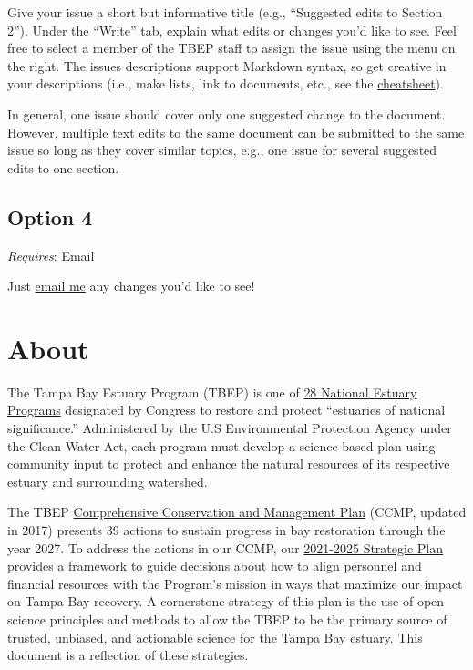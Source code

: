 \documentclass[
]{book}
\begin{document}
Give your issue a short but informative title (e.g., ``Suggested edits to Section 2''). Under the ``Write'' tab, explain what edits or changes you'd like to see. Feel free to select a member of the TBEP staff to assign the issue using the menu on the right. The issues descriptions support Markdown syntax, so get creative in your descriptions (i.e., make lists, link to documents, etc., see the \href{https://rstudio.com/wp-content/uploads/2015/03/rmarkdown-reference.pdf}{cheatsheet}).

In general, one issue should cover only one suggested change to the document. However, multiple text edits to the same document can be submitted to the same issue so long as they cover similar topics, e.g., one issue for several suggested edits to one section.

\hypertarget{opt4}{%
\subsection{Option 4}\label{opt4}}

\emph{Requires}: Email

Just \href{mailto:mbeck@tbep.org}{email me} any changes you'd like to see!

\hypertarget{about}{%
\section{About}\label{about}}

The Tampa Bay Estuary Program (TBEP) is one of \href{http://nationalestuaries.org/}{28 National Estuary Programs} designated by Congress to restore and protect ``estuaries of national significance.'' Administered by the U.S Environmental Protection Agency under the Clean Water Act, each program must develop a science-based plan using community input to protect and enhance the natural resources of its respective estuary and surrounding watershed.

The TBEP \href{http://ccmp.tbep.org/}{Comprehensive Conservation and Management Plan} (CCMP, updated in 2017) presents 39 actions to sustain progress in bay restoration through the year 2027. To address the actions in our CCMP, our \href{https://drive.google.com/file/d/11xohuoaHDxNHRqgXoOHdI37FpWvac_rn/view}{2021-2025 Strategic Plan} provides a framework to guide decisions about how to align personnel and financial resources with the Program's mission in ways that maximize our impact on Tampa Bay recovery. A cornerstone strategy of this plan is the use of open science principles and methods to allow the TBEP to be the primary source of trusted, unbiased, and actionable science for the Tampa Bay estuary. This document is a reflection of these strategies.
\end{document}
